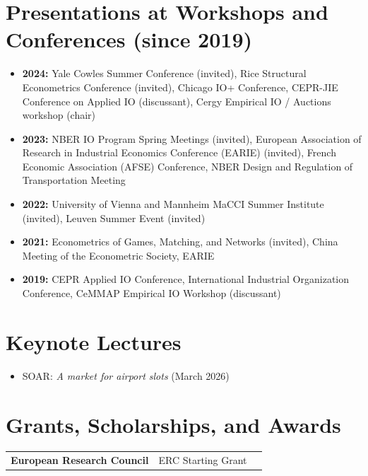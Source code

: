 \documentclass[11pt,a4paper]{article}
\begin{document}
\section*{Presentations at Workshops and Conferences (since 2019)}
\begin{itemize}
\renewcommand{\labelitemi}{\fontsize{4}{4}\selectfont$\blacksquare$}
\item \textbf{2024:} Yale Cowles Summer Conference (invited), Rice Structural Econometrics Conference (invited), Chicago IO+ Conference, CEPR-JIE Conference on Applied IO (discussant), Cergy Empirical IO / Auctions workshop (chair) \vspace{0.15cm}
\item \textbf{2023:} NBER IO Program Spring Meetings (invited), European Association of Research in Industrial Economics Conference (EARIE) (invited), French Economic Association (AFSE) Conference, NBER Design and Regulation of Transportation Meeting \vspace{0.15cm}
\item \textbf{2022:} University of Vienna and Mannheim MaCCI Summer Institute (invited), Leuven Summer Event (invited) \vspace{0.15cm}
\item \textbf{2021:} Econometrics of Games, Matching, and Networks (invited), China Meeting of the Econometric Society, EARIE \vspace{0.15cm}
\item \textbf{2019:} CEPR Applied IO Conference, International Industrial Organization Conference, CeMMAP Empirical IO Workshop (discussant) \vspace{0.15cm}
\end{itemize}


\section*{Keynote Lectures}
\begin{itemize}
\renewcommand{\labelitemi}{\fontsize{4}{4}\selectfont$\blacksquare$}
\item SOAR: \emph{A market for airport slots} (March 2026)
\end{itemize}


\section*{Grants, Scholarships, and Awards}
\noindent
\begin{tabular}{@{} p{5.25cm} p{8.25cm} >{\raggedleft\arraybackslash}p{3cm} @{}}
\textbf{European Research Council} & ERC Starting Grant & 2025 \\
\end{tabular}
\end{document}

